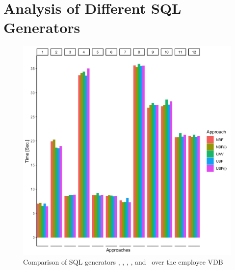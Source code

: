 \section{Analysis of Different SQL Generators}
\label{sec:exp-gen}



\begin{figure}[!t]
\centering
\includegraphics[scale=0.12] {figs/plots/emp1-5.png}
\caption[Comparison of SQL generators \nbf, \nbfi, \uav, \ubf, and \ubfi\ over the employee VDB]{Comparison of SQL generators \nbf, \nbfi, \uav, \ubf, and \ubfi\ over the employee VDB}
\label{fig:emp1-5}
\end{figure}



